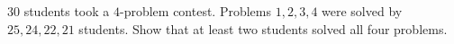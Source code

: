 $30$ students took a $4$-problem contest. Problems $1,2,3,4$ were solved by $25,24,22,21$ students. Show that at least two students solved all four problems.
